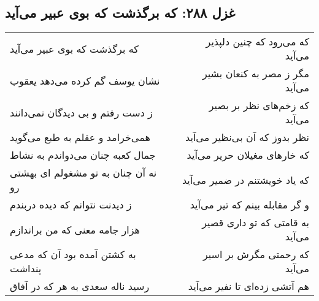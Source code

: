 \begin{center}
\section*{غزل ۲۸۸: که برگذشت که بوی عبیر می‌آید}
\label{sec:288}
\begin{longtable}{l p{0.5cm} r}
که برگذشت که بوی عبیر می‌آید
&&
که می‌رود که چنین دلپذیر می‌آید
\\
نشان یوسف گم کرده می‌دهد یعقوب
&&
مگر ز مصر به کنعان بشیر می‌آید
\\
ز دست رفتم و بی دیدگان نمی‌دانند
&&
که زخم‌های نظر بر بصیر می‌آید
\\
همی‌خرامد و عقلم به طبع می‌گوید
&&
نظر بدوز که آن بی‌نظیر می‌آید
\\
جمال کعبه چنان می‌دواندم به نشاط
&&
که خارهای مغیلان حریر می‌آید
\\
نه آن چنان به تو مشغولم ای بهشتی رو
&&
که یاد خویشتنم در ضمیر می‌آید
\\
ز دیدنت نتوانم که دیده دربندم
&&
و گر مقابله بینم که تیر می‌آید
\\
هزار جامه معنی که من براندازم
&&
به قامتی که تو داری قصیر می‌آید
\\
به کشتن آمده بود آن که مدعی پنداشت
&&
که رحمتی مگرش بر اسیر می‌آید
\\
رسید ناله سعدی به هر که در آفاق
&&
هم آتشی زده‌ای تا نفیر می‌آید
\\
\end{longtable}
\end{center}
